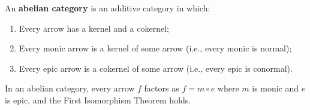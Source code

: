 An \textbf{abelian category} is an additive category in which:
\begin{enumerate}
\item Every arrow has a kernel and a cokernel;
\item Every monic arrow is a kernel of some arrow (i.e., every monic is normal);
\item Every epic arrow is a cokernel of some arrow (i.e., every epic is conormal).
\end{enumerate}
In an abelian category, every arrow $f$ factors as $f = m \circ e$ where $m$ is monic and $e$ is epic, and the First Isomorphism Theorem holds.